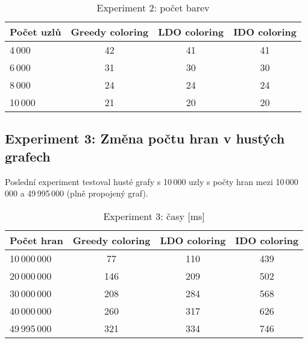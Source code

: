 \documentclass[12pt, a4paper]{article}
\begin{document}
\begin{table}[h!]
  \begin{center}
    \label{tab:table1}
    \begin{tabular}{|l|c|c|c|}
			\hline
      \textbf{Počet uzlů} & \textbf{Greedy coloring} & \textbf{LDO coloring} & \textbf{IDO coloring}\\
      \hline
       4\,000 & 42 & 41 & 41 \\ \hline
       6\,000 & 31 & 30 & 30 \\ \hline
       8\,000 & 24 & 24 & 24 \\ \hline
      10\,000 & 21 & 20 & 20 \\ \hline
    \end{tabular}
    \caption{Experiment 2: počet barev}
  \end{center}
\end{table}

\subsection{Experiment 3: Změna počtu hran v hustých grafech}
Poslední experiment testoval husté grafy s 10\,000 uzly s počty hran mezi 10\,000\,000 a 49\,995\,000 (plně propojený graf).

\begin{table}[h!]
  \begin{center}
    \label{tab:table1}
    \begin{tabular}{|l|c|c|c|}
			\hline
      \textbf{Počet hran} & \textbf{Greedy coloring} & \textbf{LDO coloring} & \textbf{IDO coloring}\\
      \hline
       10\,000\,000 & 77  & 110 & 439 \\ \hline
       20\,000\,000 & 146 & 209 & 502 \\ \hline
       30\,000\,000 & 208 & 284 & 568 \\ \hline
       40\,000\,000 & 260 & 317 & 626 \\ \hline
       49\,995\,000 & 321 & 334 & 746 \\ \hline
    \end{tabular}
    \caption{Experiment 3: časy [ms]}
  \end{center}
\end{table}
\end{document}
